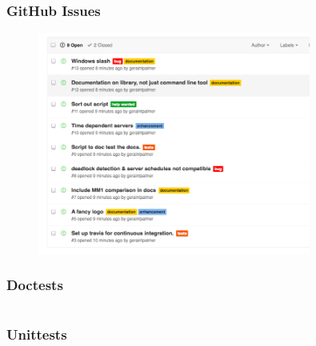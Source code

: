 \documentclass{beamer}
\begin{document}
\begin{frame}
\frametitle{GitHub Issues}
\begin{figure}
    \includegraphics[width=0.8\textwidth]{githubissues}
\end{figure}
\end{frame}

\begin{frame}
\begin{figure}
    
\end{figure}
\end{frame}


\begin{frame}
\frametitle{Doctests}
\inputminted{python}{doctests.py}
\end{frame}

\begin{frame}
\frametitle{Unittests}
\begin{center}
\fontsize{8.5pt}{10pt} \inputminted{python}{unittests.py}
\end{center}
\end{frame}
\end{document}
